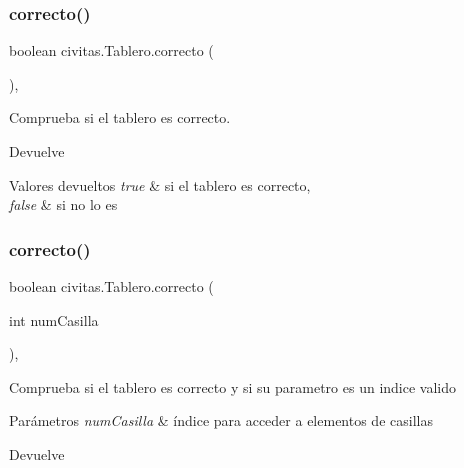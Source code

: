 \subsubsection{\texorpdfstring{correcto()}{correcto()}\hspace{0.1cm}{\footnotesize\ttfamily [1/2]}}
{\footnotesize\ttfamily boolean civitas.\+Tablero.\+correcto (\begin{DoxyParamCaption}{ }\end{DoxyParamCaption})\hspace{0.3cm}{\ttfamily [inline]}, {\ttfamily [private]}}



Comprueba si el tablero es correcto. 

\begin{DoxyReturn}{Devuelve}

\end{DoxyReturn}

\begin{DoxyRetVals}{Valores devueltos}
{\em true} & si el tablero es correcto, \\
\hline
{\em false} & si no lo es \\
\hline
\end{DoxyRetVals}
\mbox{\label{classcivitas_1_1Tablero_abe88bfd23851da8b2fb4fac8c21214b7}} 
\subsubsection{\texorpdfstring{correcto()}{correcto()}\hspace{0.1cm}{\footnotesize\ttfamily [2/2]}}
{\footnotesize\ttfamily boolean civitas.\+Tablero.\+correcto (\begin{DoxyParamCaption}\item[{int}]{num\+Casilla }\end{DoxyParamCaption})\hspace{0.3cm}{\ttfamily [inline]}, {\ttfamily [private]}}

Comprueba si el tablero es correcto y si su parametro es un indice valido 
\begin{DoxyParams}{Parámetros}
{\em num\+Casilla} & índice para acceder a elementos de casillas \\
\hline
\end{DoxyParams}
\begin{DoxyReturn}{Devuelve}

\end{DoxyReturn}

